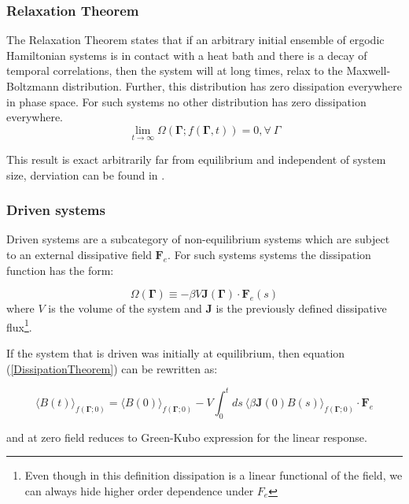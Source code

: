 \documentclass[a4paper,12pt]{article}
\begin{document}
\subsubsection{Relaxation Theorem}
The Relaxation Theorem states that if an arbitrary initial ensemble of ergodic Hamiltonian systems is in contact with a heat bath and there is a decay of temporal correlations, then the system will at long times, relax to the Maxwell-Boltzmann distribution. Further, this distribution has zero dissipation everywhere in phase space. For such systems no other distribution has zero dissipation everywhere.
\begin{displaymath}
  \lim_{t\to \infty } \Omega (\bm{\Gamma} ;f(\bm{\Gamma} ,t))=0, \forall\ \Gamma
\end{displaymath}

This result is exact arbitrarily far from equilibrium and independent of system size, derviation can be found in \cite{Evans:2241458}.
\subsubsection{Driven systems}

Driven systems are a subcategory of non-equilibrium systems which are subject to an external dissipative field $\bm{F}_e$.
For such systems systems the dissipation function has the form:

\begin{equation}
\label{primaryDissipationFunction}
  \Omega(\bm{\Gamma})\equiv - \beta V \bm{J}(\bm{\Gamma})\cdot \bm{F}_e(s)
\end{equation}
where $V$ is the volume of the system and $\bm{J}$ is the previously defined dissipative flux\footnote{Even though in this definition dissipation is a linear functional of the field, we can always hide higher order dependence under $F_e$}.

If the system that is driven was initially at equilibrium, then equation (\ref{DissipationTheorem}) can be rewritten as:

\begin{equation}
  \langle B(t) \rangle_{f(\bm{\Gamma};0)}=\langle B(0) \rangle_{f(\bm{\Gamma};0)} - V \int_0^t ds\ \langle \beta \bm{J}(0)B(s)\rangle_{f(\bm{\Gamma};0)} \cdot \bm{F}_e
\end{equation}

and at zero field reduces to Green-Kubo expression for the linear response.

\end{document}
